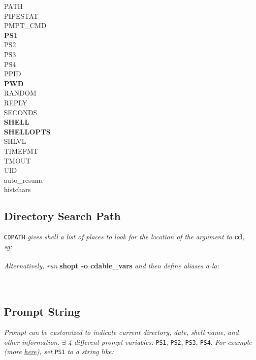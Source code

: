 {\begin{multicols*}{4}
    PATH \\ PIPESTAT\textquotesingle \\   P\textquotesingle MPT\_C\textquotesingle MD \\  \textbf{PS1} \\  PS2 \\  PS3 \\  
    PS4 \\  PPID \\ \textbf{PWD} \\  RANDOM \\   REPLY \\    SECONDS \\  \textbf{SHELL} \\
    \textbf{SHELLOPTS} \\    SHLVL \\    TIMEF\textquotesingle MT \\   TMOUT \\    UID \\ 
    auto\_resume \\ histchars
\end{multicols*}}




\subsection*{Directory Search Path}

\texttt{CDPATH}\textit{ gives shell a list of places to look for the location of the argument to }\textbf{cd}\textit{, eg:}\\
\\
\textit{Alternatively, run }\textbf{shopt -o cdable\_vars}\textit{ and then define  aliases a la:}\\
\\
\\


\subsection*{Prompt String}

\textit{Prompt can be customized to indicate current directory, date, shell name, and other information. $\exists$ 4 different prompt variables: }\texttt{PS1}, \texttt{PS2}, \texttt{PS3}, \texttt{PS4}.\textit{ For example (more \href{https://www.thegeekstuff.com/2008/09/bash-shell-ps1-10-examples-to-make-your-linux-prompt-like-angelina-jolie/}{here}), set }\texttt{PS1}\textit{ to a string like:}\\

